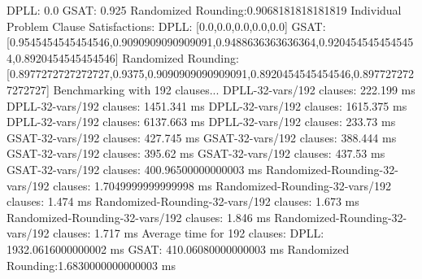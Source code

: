 \documentclass{article}
\begin{document}
  DPLL:               0.0\newline
  GSAT:               0.925\newline
  Randomized Rounding:0.9068181818181819\newline
\newline
Individual Problem Clause Satisfactions:\newline
  DPLL:               [0.0,0.0,0.0,0.0,0.0]\newline
  GSAT:               [0.9545454545454546,0.9090909090909091,0.9488636363636364,0.9204545454545454,0.8920454545454546]\newline
  Randomized Rounding:[0.8977272727272727,0.9375,0.9090909090909091,0.8920454545454546,0.8977272727272727]\newline
\newline
\newline
Benchmarking with 192 clauses...\newline
DPLL-32-vars/192 clauses: 222.199 ms\newline
DPLL-32-vars/192 clauses: 1451.341 ms\newline
DPLL-32-vars/192 clauses: 1615.375 ms\newline
DPLL-32-vars/192 clauses: 6137.663 ms\newline
DPLL-32-vars/192 clauses: 233.73 ms\newline
GSAT-32-vars/192 clauses: 427.745 ms\newline
GSAT-32-vars/192 clauses: 388.444 ms\newline
GSAT-32-vars/192 clauses: 395.62 ms\newline
GSAT-32-vars/192 clauses: 437.53 ms\newline
GSAT-32-vars/192 clauses: 400.96500000000003 ms\newline
Randomized-Rounding-32-vars/192 clauses: 1.7049999999999998 ms\newline
Randomized-Rounding-32-vars/192 clauses: 1.474 ms\newline
Randomized-Rounding-32-vars/192 clauses: 1.673 ms\newline
Randomized-Rounding-32-vars/192 clauses: 1.846 ms\newline
Randomized-Rounding-32-vars/192 clauses: 1.717 ms\newline
Average time for 192 clauses:\newline
  DPLL:               1932.0616000000002 ms\newline
  GSAT:               410.06080000000003 ms\newline
  Randomized Rounding:1.6830000000000003 ms\newline
\end{document}
